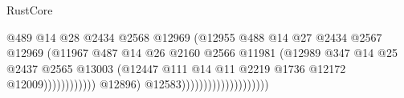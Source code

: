 \begin{lexlean}{RustCore}
\begin{coremodule}
                                                              @489
                                                              @14
                                                              @28
                                                              @2434
                                                              @2568
                                                              @12969
                                                              (@12955
                                                                @488
                                                                @14
                                                                @27
                                                                @2434
                                                                @2567
                                                                @12969
                                                                (@11967
                                                                  @487
                                                                  @14
                                                                  @26
                                                                  @2160
                                                                  @2566
                                                                  @11981
                                                                  (@12989
                                                                    @347
                                                                    @14
                                                                    @25
                                                                    @2437
                                                                    @2565
                                                                    @13003
                                                                    (@12447
                                                                      @111
                                                                      @14
                                                                      @11
                                                                      @2219
                                                                      @1736
                                                                      @12172
                                                                      @12009))))))))))))
                                              @12896)
                                            @12583))))))))))))))))))))

\end{coremodule}
\end{lexlean}
